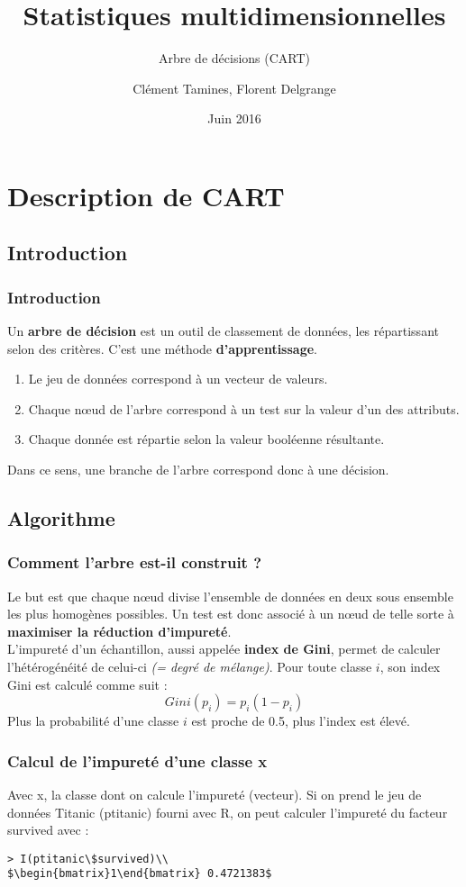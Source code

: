 \documentclass[11pt]{beamer}
\author{Clément Tamines, Florent Delgrange}
\title{Statistiques multidimensionnelles}
\subtitle[\ldots]{Arbre de décisions (CART)}
\institute{UMONS\\Faculté des Sciences\\BA 3 Sciences Informatiques}
\date{Juin 2016}
\begin{document}
\begin{frame}
\titlepage
\end{frame}

\begin{frame}
\tableofcontents
\end{frame}

\section{Description de CART}
\subsection{Introduction}
\begin{frame}
\frametitle{Introduction}
Un \textbf{arbre de décision} est un outil de classement de données, les répartissant selon des critères. C'est une méthode \textbf{d'apprentissage}.
\begin{enumerate}
\item Le jeu de données correspond à un vecteur de valeurs.
\item Chaque nœud de l'arbre correspond à un test sur la valeur d'un des attributs.
\item Chaque donnée est répartie selon la valeur booléenne résultante.
\end{enumerate}
Dans ce sens, une branche de l'arbre correspond donc à une décision.
\end{frame}

\subsection{Algorithme}
\begin{frame}
\frametitle{Comment l'arbre est-il construit ?}
Le but est que chaque nœud divise l'ensemble de données en deux sous ensemble les plus homogènes possibles.
Un test est donc associé à un nœud de telle sorte à \textbf{maximiser la réduction d'impureté}.\\
L'impureté d'un échantillon, aussi appelée \textbf{index de Gini}, permet de calculer l'hétérogénéité de celui-ci \textit{(= degré de mélange)}. Pour toute classe $i$, son index Gini est calculé comme suit :
\[Gini(p_i) = p_i (1 - p_i)\]
Plus la probabilité d'une classe $i$ est proche de 0.5, plus l'index est élevé.
\end{frame}

\begin{frame}
\frametitle{Calcul de l'impureté d'une classe x}

Avec x, la classe dont on calcule l'impureté (vecteur). Si on prend le jeu de données Titanic (ptitanic) fourni avec R, on peut calculer l'impureté du facteur survived avec : \begin{verbatim}
> I(ptitanic\$survived)\\
$\begin{bmatrix}1\end{bmatrix} 0.4721383$ \end{verbatim}
\end{frame}
\end{document}
